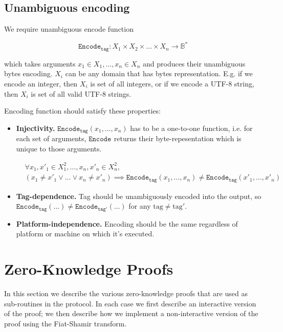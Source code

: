 \documentclass[11pt]{article}
\newcommand{\Encode}[1][]{\ensuremath{\mathtt{Encode}_{\mathtt{#1}}}}
\newcommand{\?}[1]{\stackrel{?}{#1}}
\newcommand{\Byte}{\ensuremath{\mathbb{B}}}
\begin{document}
\subsection{Unambiguous encoding}
We require unambiguous encode function 

$$\Encode[tag] : X_1 \times X_2 \times \dots \times X_n \to \Byte^*$$

which takes arguments $x_1 \in X_1, \dots, x_n \in X_n$ and produces their unambiguous bytes encoding.
$X_i$ can be any domain that has bytes representation. E.g. if we encode an integer, then $X_i$ is set
of all integers, or if we encode a UTF-8 string, then $X_i$ is set of all valid UTF-8 strings.

Encoding function should satisfy these properties:
\begin{itemize}
\item {\bf Injectivity.} $\Encode[tag](x_1, \dots, x_n)$ has to be a one-to-one function, i.e. for each
    set of arguments, $\Encode$ returns their byte-repesentation which is unique to those arguments.

    \begin{equation*}
    \begin{split}
    & \forall x_1,x'_1 \in X_1^2, \dots, x_n,x'_n \in X_n^2, \\
    & (x_1 \ne x'_1 \lor \dots \lor x_n \ne x'_n) \implies
      \Encode[tag](x_1, \dots, x_n) \ne \Encode[tag](x'_1, \dots, x'_n)
    \end{split}
    \end{equation*}
\item {\bf Tag-dependence.} Tag should be unambiguously encoded into the output, so
    $\Encode[tag](\dots) \ne \Encode[tag'](\dots)$ for any $\text{tag} \ne \text{tag}'$. 
\item {\bf Platform-independence.} Encoding should be the same regardless of platform or machine on which it's
    executed.
\end{itemize}



\section{Zero-Knowledge Proofs}
In this section we describe the various zero-knowledge proofs that are used as sub-routines in the protocol. In each case we first describe an interactive version of the proof; we then describe how we implement a non-interactive version of the proof using the Fiat-Shamir transform.
\end{document}
